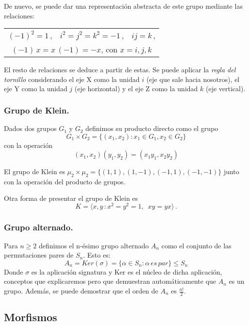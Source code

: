 De nuevo, se puede dar una representación abstracta de este grupo mediante las relaciones:
\begin{center}
  \begin{tabular}{ccc}
    $(-1)^2 = 1$\,, & $i^2 = j^2 = k^2 = -1$\,, & $ij = k$\,,\\
    \multicolumn{3}{c}{$(-1)\,x = x\,(-1) = -x$, \enspace con $x = i,j,k$}
  \end{tabular}
\end{center}

El resto de relaciones se deduce a partir de estas. Se puede aplicar la \textit{regla del tornillo} considerando el eje X como la unidad $i$ (eje que sale hacia nosotros), el eje Y como la unidad $j$ (eje horizontal) y el eje Z como la unidad $k$ (eje vertical).

\subsubsection{Grupo de Klein.}

\begin{ndef}
Dados dos grupos $G_1$ y $G_2$ definimos su producto directo como el grupo $$G_1 \times G_2 = \{(x_1,x_2):x_1 \in G_1,x_2 \in G_2\}$$ con la operación $$(x_1,x_2)(y_1,y_2) = (x_1y_1,x_2y_2)$$
\end{ndef}

El grupo de Klein es $\mu_2 \times \mu_2 = \{(1,1),(1,-1),(-1,1),(-1,-1)\}$ junto con la operación del producto de grupos.

Otra forma de presentar el grupo de Klein es \begin{equation*}
  K = \langle x, y \,: x^2 = y^2 = 1, \enspace xy = yx \rangle\,.
\end{equation*}

\subsubsection{Grupo alternado.}

Para $n \ge 2$ definimos el n-ésimo grupo alternado $A_n$ como el conjunto de las permutaciones pares de $S_n$. Esto es: $$A_n = Ker(\sigma) = \{\alpha \in S_n : \alpha \, es \, par\} \le S_n$$ Donde $\sigma$ es la aplicación signatura y Ker es el núcleo de dicha aplicación, conceptos que explicaremos pero que demuestran automáticamente que $A_n$ es un grupo. Además, se puede demostrar que el orden de $A_n$ es $\frac{n!}{2}$.

\subsection{Morfismos}

